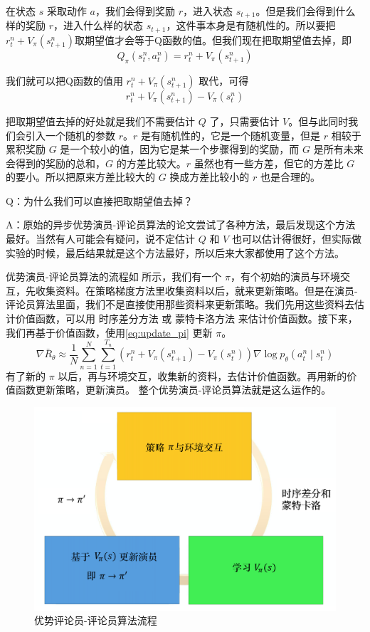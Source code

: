 在状态 $s$ 采取动作 $a$，我们会得到奖励 $r$，进入状态 $s_{t+1}$。但是我们会得到什么样的奖励 $r$，进入什么样的状态 $s_{t+1}$，这件事本身是有随机性的。所以要把$r_{t}^{n}+V_{\pi}\left(s_{t+1}^{n}\right)$取期望值才会等于Q函数的值。但我们现在把取期望值去掉，即
\begin{equation}
  \label{eq:}
  Q_{\pi}\left(s_{t}^{n}, a_{t}^{n}\right)=r_{t}^{n}+V_{\pi}\left(s_{t+1}^{n}\right)
\end{equation}

我们就可以把Q函数的值用 $r_t^n + V_{\pi}\left(s_{t+1}^{n}\right)$ 取代，可得
\begin{equation}
  \label{eq:}
  r_{t}^{n}+V_{\pi}\left(s_{t+1}^{n}\right)-V_{\pi}\left(s_{t}^{n}\right)
\end{equation}

把取期望值去掉的好处就是我们不需要估计 $Q$ 了，只需要估计 $V$。但与此同时我们会引入一个随机的参数 $r$。$r$ 是有随机性的，它是一个随机变量，但是 $r$ 相较于累积奖励 $G$ 是一个较小的值，因为它是某一个步骤得到的奖励，而 $G$ 是所有未来会得到的奖励的总和，$G$ 的方差比较大。$r$ 虽然也有一些方差，但它的方差比 $G$ 的要小。所以把原来方差比较大的 $G$ 换成方差比较小的 $r$ 也是合理的。

Q：为什么我们可以直接把取期望值去掉？

A：原始的异步优势演员-评论员算法的论文尝试了各种方法，最后发现这个方法最好。当然有人可能会有疑问，说不定估计 $Q$ 和 $V$ 也可以估计得很好，但实际做实验的时候，最后结果就是这个方法最好，所以后来大家都使用了这个方法。

优势演员-评论员算法的流程如 所示，我们有一个 $\pi$，有个初始的演员与环境交互，先收集资料。在策略梯度方法里收集资料以后，就来更新策略。但是在演员-评论员算法里面，我们不是直接使用那些资料来更新策略。我们先用这些资料去估计价值函数，可以用 时序差分方法 或 蒙特卡洛方法 来估计价值函数。接下来，我们再基于价值函数，使用\eqref{eq:update_pi} 更新 $\pi$。
\begin{equation}
  \label{eq:update_pi}
  \nabla \bar{R}_{\theta} \approx \frac{1}{N} \sum_{n=1}^{N} \sum_{t=1}^{T_{n}}\left(r_{t}^{n}+V_{\pi}\left(s_{t+1}^{n}\right)-V_{\pi}\left(s_{t}^{n}\right)\right) \nabla \log p_{\theta}\left(a_{t}^{n} \mid s_{t}^{n}\right)
\end{equation}
有了新的 $\pi$ 以后，再与环境交互，收集新的资料，去估计价值函数。再用新的价值函数更新策略，更新演员。
整个优势演员-评论员算法就是这么运作的。

\begin{figure}[h]
  \centering
  \includegraphics[width=0.4\linewidth]{res/ch9/9.5}
  \caption{优势评论员-评论员算法流程}
  \label{fig:fig9.5}
\end{figure}

